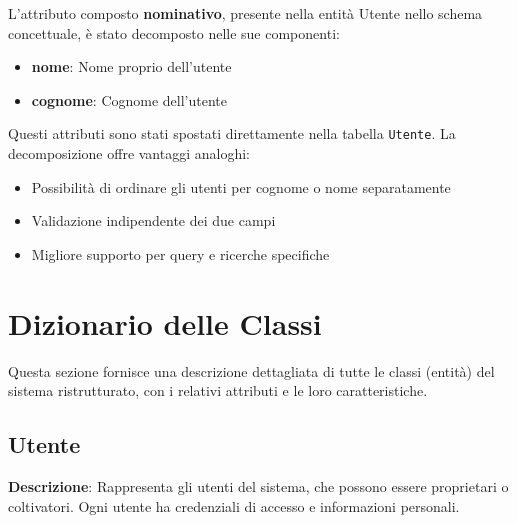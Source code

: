 \documentclass[12pt,a4paper]{article}
\begin{document}
L'attributo composto \textbf{nominativo}, presente nella entità Utente nello schema concettuale, è stato decomposto nelle sue componenti:

\begin{itemize}
    \item \textbf{nome}: Nome proprio dell'utente
    \item \textbf{cognome}: Cognome dell'utente
\end{itemize}

Questi attributi sono stati spostati direttamente nella tabella \texttt{Utente}. La decomposizione offre vantaggi analoghi:

\begin{itemize}
    \item Possibilità di ordinare gli utenti per cognome o nome separatamente
    \item Validazione indipendente dei due campi
    \item Migliore supporto per query e ricerche specifiche
\end{itemize}

\newpage

\section{Dizionario delle Classi}

Questa sezione fornisce una descrizione dettagliata di tutte le classi (entità) del sistema ristrutturato, con i relativi attributi e le loro caratteristiche.

\subsection{Utente}

\textbf{Descrizione}: Rappresenta gli utenti del sistema, che possono essere proprietari o coltivatori. Ogni utente ha credenziali di accesso e informazioni personali.
\end{document}

